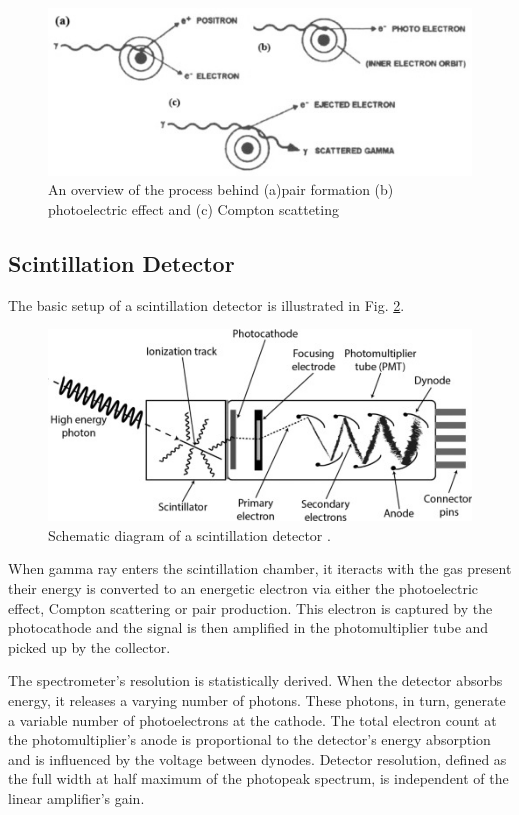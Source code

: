     \begin{figure}[H]
        \centering
        \includegraphics[width=0.8\columnwidth]{images/a.jpg}
        \caption{An overview of the process behind (a)pair formation (b) photoelectric effect and (c) Compton scatteting}
        \label{a}
    \end{figure}

\subsection{Scintillation Detector}

The basic setup of a scintillation detector is illustrated in Fig. \ref{det}.

\begin{figure}[H]
    \centering
    \includegraphics[width=1\columnwidth]{images/det.jpg}
    \caption{Schematic diagram of a scintillation detector \cite{KERLIN2019213}.}
    \label{det}
\end{figure}

When gamma ray enters the scintillation chamber, it iteracts with the gas present their energy is converted to an energetic electron via either the photoelectric effect, Compton scattering or pair production. This electron is captured by the photocathode and the signal is then amplified in the photomultiplier tube and picked up by the collector.  

The spectrometer's resolution is statistically derived. When the detector absorbs energy, it releases a varying number of photons. These photons, in turn, generate a variable number of photoelectrons at the cathode. The total electron count at the photomultiplier's anode is proportional to the detector's energy absorption and is influenced by the voltage between dynodes. Detector resolution, defined as the full width at half maximum of the photopeak spectrum, is independent of the linear amplifier's gain.

